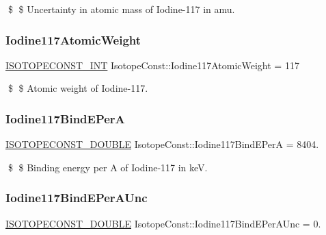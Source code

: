 \$ \$ Uncertainty in atomic mass of Iodine-\/117 in amu. \mbox{\label{group___isotope_const-_iodine-_i117_gafc993a5155680e148b9444ba1a75eaf2}} 
\subsubsection{\texorpdfstring{Iodine117\+Atomic\+Weight}{Iodine117AtomicWeight}}
{\footnotesize\ttfamily \mbox{\hyperlink{group___isotope_const-_macros_ga5f18360b3e99483a35c32d789e62621c}{I\+S\+O\+T\+O\+P\+E\+C\+O\+N\+S\+T\+\_\+\+I\+NT}} Isotope\+Const\+::\+Iodine117\+Atomic\+Weight = 117}

\$ \$ Atomic weight of Iodine-\/117. \mbox{\label{group___isotope_const-_iodine-_i117_ga3407ac364d6e0561440cfe6a773dbb57}} 
\subsubsection{\texorpdfstring{Iodine117\+Bind\+E\+PerA}{Iodine117BindEPerA}}
{\footnotesize\ttfamily \mbox{\hyperlink{group___isotope_const-_macros_ga8f45a7272ce02c0b4c65c44636ed719a}{I\+S\+O\+T\+O\+P\+E\+C\+O\+N\+S\+T\+\_\+\+D\+O\+U\+B\+LE}} Isotope\+Const\+::\+Iodine117\+Bind\+E\+PerA = 8404.}

\$ \$ Binding energy per A of Iodine-\/117 in keV. \mbox{\label{group___isotope_const-_iodine-_i117_ga647381c9fc9faf5eee9c647777a729be}} 
\subsubsection{\texorpdfstring{Iodine117\+Bind\+E\+Per\+A\+Unc}{Iodine117BindEPerAUnc}}
{\footnotesize\ttfamily \mbox{\hyperlink{group___isotope_const-_macros_ga8f45a7272ce02c0b4c65c44636ed719a}{I\+S\+O\+T\+O\+P\+E\+C\+O\+N\+S\+T\+\_\+\+D\+O\+U\+B\+LE}} Isotope\+Const\+::\+Iodine117\+Bind\+E\+Per\+A\+Unc = 0.}

